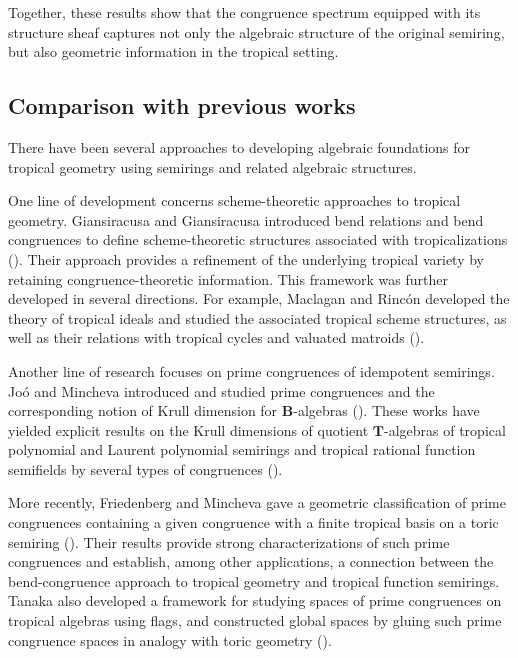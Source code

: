 \documentclass[a4paper,12pt]{amsart}
\theoremstyle{plain}
\theoremstyle{definition}
\begin{document}
Together, these results show that the congruence spectrum equipped with its structure sheaf captures not only the algebraic structure of the original semiring, but also geometric information in the tropical setting.

\subsection{Comparison with previous works}
    \label{subsection1.3}

There have been several approaches to developing algebraic foundations for tropical geometry using semirings and related algebraic structures.

One line of development concerns scheme-theoretic approaches to tropical geometry.
Giansiracusa and Giansiracusa introduced bend relations and bend congruences to define scheme-theoretic structures associated with tropicalizations (\cite{Giansiracusa=Giansiracusa2}).
Their approach provides a refinement of the underlying tropical variety by retaining congruence-theoretic information.
This framework was further developed in several directions.
For example, Maclagan and Rinc\'on developed the theory of tropical ideals and studied the associated tropical scheme structures, as well as their relations with tropical cycles and valuated matroids (\cite{Maclagan=Rincon1,Maclagan=Rincon2}).

Another line of research focuses on prime congruences of idempotent semirings.
Jo\'{o} and Mincheva introduced and studied prime congruences and the corresponding notion of Krull dimension for $\boldsymbol{B}$-algebras (\cite{Joo=Mincheva}).
These works have yielded explicit results on the Krull dimensions of quotient $\boldsymbol{T}$-algebras of tropical polynomial and Laurent polynomial semirings and tropical rational function semifields by several types of congruences (\cite{Joo=Mincheva3, Nakajima=Song}).

More recently, Friedenberg and Mincheva gave a geometric classification of prime congruences containing a given congruence with a finite tropical basis on a toric semiring (\cite{Friedenberg=Mincheva}).
Their results provide strong characterizations of such prime congruences and establish, among other applications, a connection between the bend-congruence approach to tropical geometry and tropical function semirings.
Tanaka also developed a framework for studying spaces of prime congruences on tropical algebras using flags, and constructed global spaces by gluing such prime congruence spaces in analogy with toric geometry (\cite{Tanaka}). 
\end{document}
